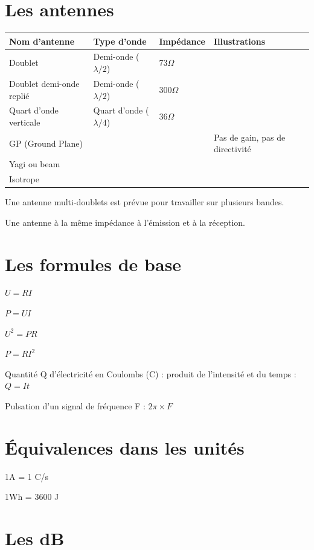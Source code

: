 \documentclass[a4paper,12pt,oneside]{report} %
\begin{document}
		\section{Les antennes}
			\begin{center}
			\begin{longtable}{|L{3cm}|L{3.5cm}|L{2cm}|L{3.5cm}|}
				\hline
				Nom d'antenne & Type d'onde & Impédance & Illustrations \tabularnewline
				\hline
				Doublet & Demi-onde ($\lambda/2$) & $73 \Omega$ & \tabularnewline
				\hline
				Doublet demi-onde replié & Demi-onde ($\lambda/2$) & $300 \Omega$ & \tabularnewline
				\hline
				Quart d'onde verticale & Quart d'onde ($\lambda/4$) & $36 \Omega$ & \tabularnewline
				\hline
				GP (Ground Plane) & & & Pas de gain, pas de directivité\tabularnewline
				\hline
				Yagi ou beam & & & \tabularnewline
				\hline
				Isotrope & & & \tabularnewline
				\hline
			
			\end{longtable}
			\end{center}
			
			Une antenne multi-doublets est prévue pour travailler sur plusieurs bandes.
			
			Une antenne à la même impédance à l'émission et à la réception.
			
			
			\section{Les formules de base}
	$U = RI$
	
	$P = UI$
	
	$U^2 = PR$
	
	$P = RI^2$
	
	Quantité Q d'électricité en Coulombs (C) : produit de l'intensité et du temps : $Q = It$
	
	Pulsation d'un signal de fréquence F : $2\pi \times F$
	
	
	
	
	
	\section{Équivalences dans les unités}
	1A = 1 C/s
	
	1Wh = 3600 J
	
	
	
	
	
	
	\section{Les dB}
	
\end{document}
